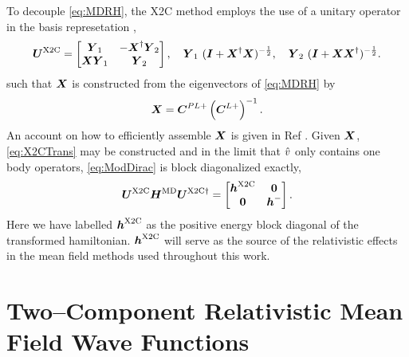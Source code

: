 To decouple \cref{eq:MDRH},
the X2C method employs the use of a unitary operator in the basis represetation \cite{Reiher13_184105,Liu16_204},
\begin{equation}
\label{eq:X2CTrans}
\boldsymbol{U}^{\mathrm{X2C}} = \begin{bmatrix} \boldsymbol{Y}_1 & - \boldsymbol{X}^\dagger \boldsymbol{Y}_2 \\ \boldsymbol{X} \boldsymbol{Y}_1 & \boldsymbol{Y}_2 \end{bmatrix},
\quad \boldsymbol{Y}_1 \ (\boldsymbol{I} + \boldsymbol{X}^\dagger \boldsymbol{X})^{-\frac{1}{2}},  
\quad \boldsymbol{Y}_2 \ (\boldsymbol{I} + \boldsymbol{X} \boldsymbol{X}^\dagger)^{-\frac{1}{2}}.  
\end{equation}
such that $\boldsymbol{X}$ is constructed from the eigenvectors of \cref{eq:MDRH} by
\begin{equation}
\boldsymbol{X} = \boldsymbol{C}^{PL+} \left(\boldsymbol{C}^{L+}\right)^{-1}.
\end{equation}
An account on how to efficiently assemble $\boldsymbol{X}$ is given in Ref \cite{Reiher13_184105}.
Given $\boldsymbol{X}$, \cref{eq:X2CTrans} may 
be constructed and in the limit that $\hat{v}$ only contains one body operators, \cref{eq:ModDirac} is block diagonalized 
exactly,
\begin{equation}
  \label{eq:X2CHam}
\boldsymbol{U}^{\mathrm{X2C}} \boldsymbol{H}^\mathrm{MD} \boldsymbol{U}^{\mathrm{X2C}\dagger} = \begin{bmatrix} \boldsymbol{h}^{\mathrm{X2C}} & \boldsymbol{0} \\ \boldsymbol{0} & \boldsymbol{h}^- \end{bmatrix}.
\end{equation}
Here we have labelled $\boldsymbol{h}^{\mathrm{X2C}}$ as the positive energy block diagonal of the transformed hamiltonian. $\boldsymbol{h}^{\mathrm{X2C}}$ 
will serve as the source of the relativistic effects in the mean field methods used throughout this work.










\section{Two--Component Relativistic Mean Field Wave Functions}
\label{sec:MF2C}


